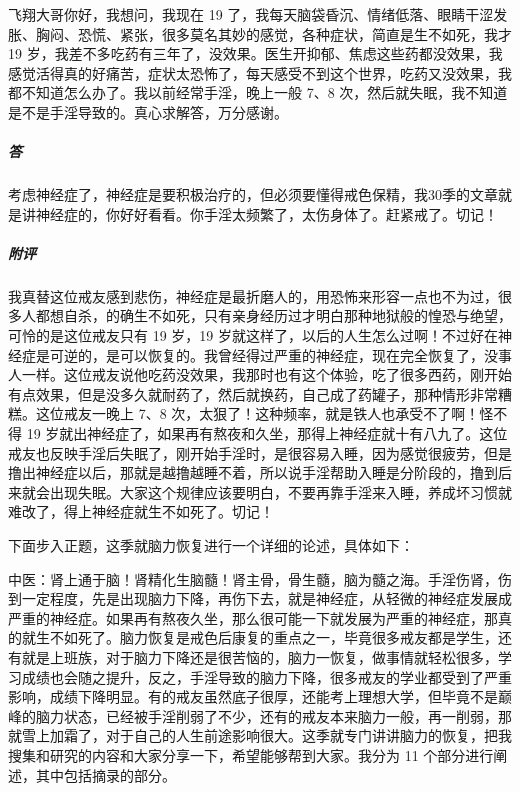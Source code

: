\begin{case}
    飞翔大哥你好，我想问，我现在 19 了，我每天脑袋昏沉、情绪低落、眼睛干涩发胀、胸闷、恐慌、紧张，很多莫名其妙的感觉，各种症状，简直是生不如死，我才 19 岁，我差不多吃药有三年了，没效果。医生开抑郁、焦虑这些药都没效果，我感觉活得真的好痛苦，症状太恐怖了，每天感受不到这个世界，吃药又没效果，我都不知道怎么办了。我以前经常手淫，晚上一般 7、8 次，然后就失眠，我不知道是不是手淫导致的。真心求解答，万分感谢。
    \subparagraph{答} 考虑神经症了，神经症是要积极治疗的，但必须要懂得戒色保精，我30季的文章就是讲神经症的，你好好看看。你手淫太频繁了，太伤身体了。赶紧戒了。切记！
    \subparagraph{附评} 我真替这位戒友感到悲伤，神经症是最折磨人的，用恐怖来形容一点也不为过，很多人都想自杀，的确生不如死，只有亲身经历过才明白那种地狱般的惶恐与绝望，可怜的是这位戒友只有 19 岁，19 岁就这样了，以后的人生怎么过啊！不过好在神经症是可逆的，是可以恢复的。我曾经得过严重的神经症，现在完全恢复了，没事人一样。这位戒友说他吃药没效果，我那时也有这个体验，吃了很多西药，刚开始有点效果，但是没多久就耐药了，然后就换药，自己成了药罐子，那种情形非常糟糕。这位戒友一晚上 7、8 次，太狠了！这种频率，就是铁人也承受不了啊！怪不得 19 岁就出神经症了，如果再有熬夜和久坐，那得上神经症就十有八九了。这位戒友也反映手淫后失眠了，刚开始手淫时，是很容易入睡，因为感觉很疲劳，但是撸出神经症以后，那就是越撸越睡不着，所以说手淫帮助入睡是分阶段的，撸到后来就会出现失眠。大家这个规律应该要明白，不要再靠手淫来入睡，养成坏习惯就难改了，得上神经症就生不如死了。切记！
\end{case}

下面步入正题，这季就脑力恢复进行一个详细的论述，具体如下：

中医：肾上通于脑！肾精化生脑髓！肾主骨，骨生髓，脑为髓之海。手淫伤肾，伤到一定程度，先是出现脑力下降，再伤下去，就是神经症，从轻微的神经症发展成严重的神经症。如果再有熬夜久坐，那么很可能一下就发展为严重的神经症，那真的就生不如死了。脑力恢复是戒色后康复的重点之一，毕竟很多戒友都是学生，还有就是上班族，对于脑力下降还是很苦恼的，脑力一恢复，做事情就轻松很多，学习成绩也会随之提升，反之，手淫导致的脑力下降，很多戒友的学业都受到了严重影响，成绩下降明显。有的戒友虽然底子很厚，还能考上理想大学，但毕竟不是巅峰的脑力状态，已经被手淫削弱了不少，还有的戒友本来脑力一般，再一削弱，那就雪上加霜了，对于自己的人生前途影响很大。这季就专门讲讲脑力的恢复，把我搜集和研究的内容和大家分享一下，希望能够帮到大家。我分为 11 个部分进行阐述，其中包括摘录的部分。

